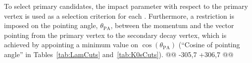 { To select primary candidates, the impact parameter with respect to the primary vertex is used as a selection criterion for each \Vz.
 Furthermore, a restriction is imposed on the pointing angle, $\theta_{\mathrm{PA}}$, between the \Vz momentum and the vector pointing from the primary vertex to the secondary \Vz decay vertex, which is achieved by appointing a minimum value on $\cos(\theta_{\mathrm{PA}})$ (``Cosine of pointing angle'' in Tables~\ref{tab:LamCuts} and~\ref{tab:K0sCuts}).
@@ -305,7 +306,7 @@
 \begin{comment}
 In order to remove the contamination to the \LamALam and \Ks samples due to misidentification of the protons and pions for each \Vz, the mass assuming different identities (\Lam, \ALam, \Ks)\footnote[1]
 {
-For the misidentification cuts, the mass assuming \Ks hypothesis ($m_{\mathrm{inv,~ K^{0}_{S}~ hyp.}}$) is calculated assuming $\pi^{+}\pi^{-}$ daughters, the mass assuming \Lam hypothesis ($m_{\mathrm{inv,~ \Lambda~ hyp.}}$) is calculated assuming p$\pi^{-}$ daughters, and the mass assuming \ALam hypothesis ($m_{\mathrm{inv,~ \overline{\Lambda}~ hyp.}}$) is calculated assuming $\overline{\mathrm{p}}\pi^{+}$ daughters. 
+For the misidentification cuts, the mass assuming \Ks hypothesis ($m_{\mathrm{inv,~ K^{0}_{S}~ hyp.}}$) is calculated assuming $\uppi^{+}\uppi^{-}$ daughters, the mass assuming \Lam hypothesis ($m_{\mathrm{inv,~ \Lambda~ hyp.}}$) is calculated assuming p$\uppi^{-}$ daughters, and the mass assuming \ALam hypothesis ($m_{\mathrm{inv,~ \overline{\Lambda}~ hyp.}}$) is calculated assuming $\overline{\mathrm{p}}\uppi^{+}$ daughters. 
 Additionally, $m_{\mathrm{PDG,\,K^{0}_{S}}}$ and $m_{\mathrm{PDG,\,\Lambda(\overline{\Lambda})}}$ denote the particle masses of the \Ks and \LamALam, respectively, as recorded by the Particle Data Group~\cite{PhysRevD.98.030001}.
 }
 is calculated and utilized in a set of misidentification cuts.
@@ -313,7 +314,7 @@
 \end{comment}
 
}
